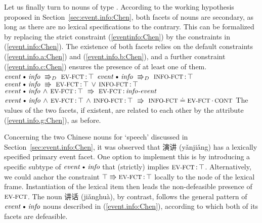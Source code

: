 \documentclass[output=paper,colorlinks,citecolor=brown,chinesefont]{langscibook}
\begin{document}
Let us finally turn to nouns of type \dott{}.
According to the working hypothesis proposed in Section~\ref{sec:event.info:Chen}, both facets of  \dott{} nouns are secondary, as long as there are no lexical specifications to the contrary.
This can be formalized by replacing the strict constraint (\ref{eventinfo:Chen}) by the constraints in (\ref{event.info:Chen}).
The existence of both facets relies on the default constraints (\ref{event.info.a:Chen}) and (\ref{event.info.b:Chen}), and a further constraint (\ref{event.info.c:Chen}) ensures the presence of at least one of them.
%
\ea\label{event.info:Chen}
\ea\label{event.info.a:Chen}
$\type{event}\dott\type{info}~\dimplic~\feat{ev-fct}\D\top$
\ex\label{event.info.b:Chen}
$\type{event}\dott\type{info}~\dimplic~\feat{info-fct}\D\top$
\ex\label{event.info.c:Chen}
$\type{event}\dott\type{info}~\implic~\feat{ev-fct}\D\top\vel\feat{info-fct}\D\top$
\ex\label{event.info.d:Chen}
$\type{event}\dott\type{info}\und\feat{ev-fct}\D\top~\implic~\feat{ev-fct}\D\type{info-event}$
\ex\label{event.info.g:Chen}
$\type{event}\dott\type{info}\und\feat{ev-fct}\D\top\und\feat{info-fct}\D\top~\implic~\feat{info-fct}\patheq\feat{ev-fct}\CP\feat{cont}$
\z
\z
%
The values of the two facets, if existent, %
are related to each other by the  attribute (\ref{event.info.g:Chen}), as before.

Concerning the two Chinese nouns for `speech' discussed in Section~\ref{sec:event.info:Chen}, it was observed that {\cn 演讲} (y\v{a}nji\v{a}ng) has a lexically specified primary event facet.
One option to implement this is by introducing a specific subtype of $\type{event}\dott\type{info}$ that (strictly) implies $\feat{ev-fct}\D\top$.
Alternatively, we could anchor the constraint $\top\implic\feat{ev-fct}\D\top$ locally to the  node of the lexical frame.
Instantiation of the lexical item then leads the non-defeasible presence of $\feat{ev-fct}$.
The noun {\cn 讲话} (ji\v{a}nghu\`{a}), by contrast, follows the general pattern of $\type{event}\dott\type{info}$ nouns described in (\ref{event.info:Chen}), according to which both of its facets are defeasible.
\end{document}
